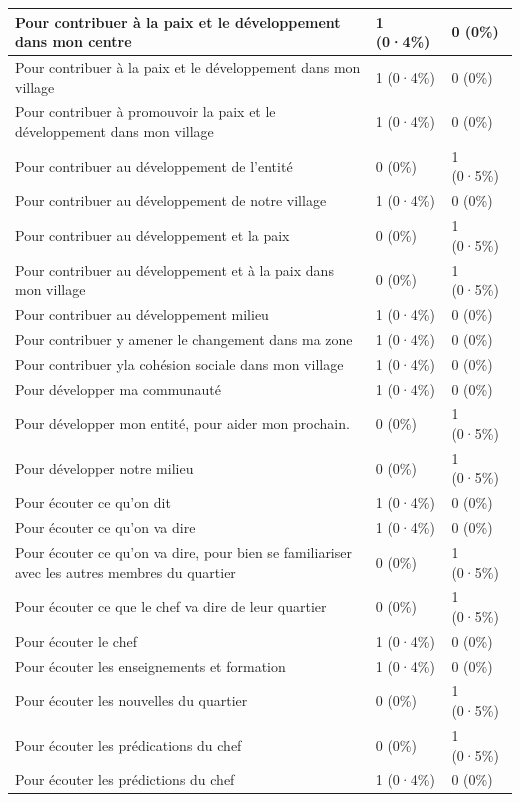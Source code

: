 \documentclass[
]{book}
\begin{document}
\begin{tabular}{l|l|l}
\hline
Pour contribuer à la paix et le développement dans mon centre & 1 (0·4\%) & 0 (0\%)\\
\hline
Pour contribuer à la paix et le développement dans mon village & 1 (0·4\%) & 0 (0\%)\\
\hline
Pour contribuer à promouvoir la paix et le développement dans mon village & 1 (0·4\%) & 0 (0\%)\\
\hline
Pour contribuer au développement de l'entité & 0 (0\%) & 1 (0·5\%)\\
\hline
Pour contribuer au développement de notre village & 1 (0·4\%) & 0 (0\%)\\
\hline
Pour contribuer au développement et  la paix & 0 (0\%) & 1 (0·5\%)\\
\hline
Pour contribuer au développement et à la paix dans mon village & 0 (0\%) & 1 (0·5\%)\\
\hline
Pour contribuer au développement milieu & 1 (0·4\%) & 0 (0\%)\\
\hline
Pour contribuer y amener le changement dans ma zone & 1 (0·4\%) & 0 (0\%)\\
\hline
Pour contribuer yla cohésion sociale dans mon village & 1 (0·4\%) & 0 (0\%)\\
\hline
Pour développer ma communauté & 1 (0·4\%) & 0 (0\%)\\
\hline
Pour développer mon entité, pour aider mon prochain. & 0 (0\%) & 1 (0·5\%)\\
\hline
Pour développer notre milieu & 0 (0\%) & 1 (0·5\%)\\
\hline
Pour écouter ce qu'on dit & 1 (0·4\%) & 0 (0\%)\\
\hline
Pour écouter ce qu'on va dire & 1 (0·4\%) & 0 (0\%)\\
\hline
Pour écouter ce qu'on va dire, pour bien se familiariser avec les autres membres du quartier & 0 (0\%) & 1 (0·5\%)\\
\hline
Pour écouter ce que le chef va dire de leur quartier & 0 (0\%) & 1 (0·5\%)\\
\hline
Pour écouter le chef & 1 (0·4\%) & 0 (0\%)\\
\hline
Pour écouter les enseignements et formation & 1 (0·4\%) & 0 (0\%)\\
\hline
Pour écouter les nouvelles du quartier & 0 (0\%) & 1 (0·5\%)\\
\hline
Pour écouter les prédications du chef & 0 (0\%) & 1 (0·5\%)\\
\hline
Pour écouter les prédictions du chef & 1 (0·4\%) & 0 (0\%)\\

\end{tabular}
\end{document}
